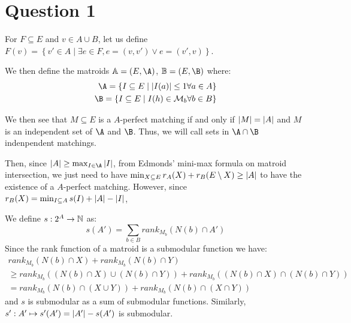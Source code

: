 \documentclass[math, info]{cours}
\begin{document}
\section{Question 1}
\begin{notationT}
For $F \subseteq E$ and $v \in A\cup B$, let us define $F(v) = \left\{ v'\in A \mid \exists e \in F, e = (v, v') \lor e = (v', v) \right\}$.
\end{notationT}

We then define the matroids $\mathbb{A} = (E, \A)$, $\mathbb{B} = (E, \B)$ where:
\begin{align*}
	\A = \left\{ I \subseteq E \mid \abs{I(a)} \leq 1 \forall a \in A\right\}\\
	\B = \left\{ I \subseteq E \mid I(h) \in \mathcal{M}_{b} \forall b \in B\right\}
\end{align*}

We then see that $M \subseteq E$ is a $A$-perfect matching if and only if $\left|M\right| = \left|A\right|$ and
$M$ is an independent set of $\A$ and $\B$.
Thus, we will call sets in $\A \cap \B$ indenpendent matchings.

Then, since $\abs{A} \geq \max_{I \in \A}{\abs{I}}$, from Edmonds' mini-max formula on matroid intersection, we just need to have $\min_{X\subseteq E} r_{A}(X) + r_{B}(E\setminus X) \geq \left|A\right|$ to have the existence of a $A$-perfect matching.
However, since $r_{B}(X) = \min_{I \subseteq A} s(I) + \left|A\right| - \left|I\right|$,

We define $s : 2^{A} \to \mathbb{N}$ as:
\begin{equation}
	s(A') = \sum_{b \in B} rank_{M_{b}}(N(b) \cap A')
\end{equation}
Since the rank function of a matroid is a submodular function we have:
\begin{align*}
	rank_{M_{b}}(N(b) \cap X) + rank_{M_{b}}(N(b) \cap Y)\\
	\geq rank_{M_{b}}((N(b) \cap X) \cup (N(b) \cap Y)) + rank_{M_{b}}((N(b) \cap X) \cap (N(b) \cap Y))\\
	 = rank_{M_{b}}(N(b) \cap (X \cup Y)) + rank_{M_{b}}(N(b) \cap (X \cap Y))
\end{align*}
and $s$ is submodular as a sum of submodular functions.
Similarly, $s': A' \mapsto s'(A') = \left|A'\right| - s(A')$ is submodular.
\end{document}
